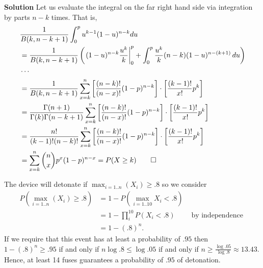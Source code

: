 \documentclass{stat_homework}
\begin{document}

{\bf Solution}
Let us evaluate the integral on the far right hand side via integration by parts $n-k$ times.  That is,
\begin{align*}
&\frac{1}{B(k,n-k+1)}\int_0^pu^{k-1}(1-u)^{n-k}du \\
&=\frac{1}{B(k,n-k+1)}\left( \left. (1-u)^{n-k} \frac{u^k}{k} \right|_0^p + \int_0^p \frac{u^k}{k} (n-k)(1-u)^{n-(k+1)}\,du\right)\\
&\cdots\\
&=\frac{1}{B(k,n-k+1)}\sum_{x=k}^n \left[ \frac{(n-k)!}{(n-x)!}(1-p)^{n-k}\right] \cdot \left[\frac{(k-1)!}{x!}p^k \right]\\
&=\frac{\Gamma(n+1)}{\Gamma(k)\Gamma(n-k+1)}\sum_{x=k}^n \left[ \frac{(n-k)!}{(n-x)!}(1-p)^{n-k}\right] \cdot \left[\frac{(k-1)!}{x!}p^k \right]\\
&=\frac{n!}{(k-1)!(n-k)!}\sum_{x=k}^n \left[ \frac{(n-k)!}{(n-x)!}(1-p)^{n-k}\right] \cdot \left[\frac{(k-1)!}{x!}p^k \right]\\
& = \sum_{x=k}^{n} \binom nxp^x(1-p)^{n-x}  = P(X \ge k)\qed
\end{align*}


\begin{solution}
  The device will detonate if $\max_{i=1..n}(X_i) \ge .8$ so we consider
  \begin{align*}
    P\left(\max_{i=1..n}(X_i) \ge .8\right) &= 1 - P\left(\max_{i=1..10} X_i < .8\right)\\
    &= 1 - \prod_i^{10} P(X_i < .8) & \text{ by independence } \\
    &= 1 - (.8)^n.
  \end{align*}
  If we require that this event has at least a probability of $.95$ then $1 - (.8)^n \ge .95$ if and only if $n \log .8 \le \log .05$ if and only if $n \ge \frac{\log .05}{\log .8} \approx 13.43$. Hence, at least 14 fuses guarantees a probability of $.95$ of detonation.
\end{solution}
\end{document}
